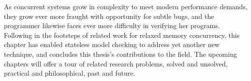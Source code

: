 {As concurrent systems grow in complexity to meet modern performance demands,
they grow ever more fraught with opportunity for subtle bugs,
and the programmer likewise faces ever more difficulty in verifying her programs.
Following in the footsteps of related work for relaxed memory concurrency,
this chapter has enabled stateless model checking to address yet another new technique,
and concludes this thesis's contributions to the field.
The upcoming chapters will offer a tour of related research problems,
solved and unsolved,
practical and philosophical,
past and future.

}
